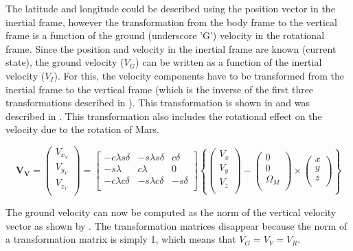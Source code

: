 \noindent
The latitude and longitude could be described using the position vector in the inertial frame, however the transformation from the body frame to the vertical frame is a function of the ground (underscore 'G') velocity in the rotational frame. Since the position and velocity in the inertial frame are known (current state), the ground velocity ($V_{G}$) can be written as a function of the inertial velocity ($V_{I}$). For this, the velocity components have to be transformed from the inertial frame to the vertical frame (which is the inverse of the first three transformations described in ). This transformation is shown in  and was described in \cite{mooij1994motion}. This transformation also includes the rotational effect on the velocity due to the rotation of Mars.
 
 \begin{equation} \label{eq:VItoVV}
\mathbf{V_{V}} =  
 \begin{pmatrix}
V_{x_{V}}\\
V_{y_{V}}\\
V_{z_{V}}\\
\end{pmatrix}
=
\left[
\begin{matrix}
-c\lambda s\delta & -s\lambda s\delta & c\delta\\
-s\lambda & c\lambda & 0\\
-c\lambda c\delta & -s\lambda c\delta & -s\delta\\
\end{matrix}
\right]
\left\lbrace
\begin{pmatrix}
V_{x}\\
V_{y}\\
V_{z}\\
\end{pmatrix}
-
\begin{pmatrix}
0 \\
0 \\
\Omega_{M} \\
\end{pmatrix}
\times
\begin{pmatrix}
x \\
y \\
z \\
\end{pmatrix}
\right\rbrace
 \end{equation}

\noindent
The ground velocity can now be computed as the norm of the vertical velocity vector as shown by . The transformation matrices disappear because the norm of a transformation matrix is simply 1, which means that $V_{G}=V_{V}=V_{R}$.


